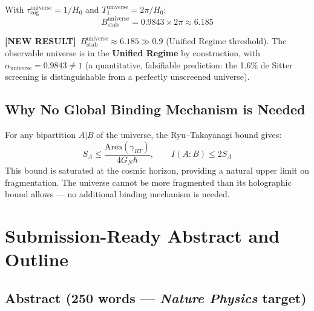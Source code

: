 \documentclass[11pt,letterpaper]{article}
\newcommand{\NEW}{\textcolor{newresult}{\textbf{[NEW RESULT]}}}
\newcommand{\SA}{S_A}
\newcommand{\tcog}{\tau_{\mathrm{cog}}}
\begin{document}
With $\tcog^{\mathrm{universe}} = 1/H_0$ and $T_1^{\mathrm{universe}} = 2\pi/H_0$:
\begin{equation}
  \boxed{B_{\mathrm{stab}}^{\mathrm{universe}} = 0.9843 \times 2\pi \approx 6.185}
  \label{eq:Bstab_universe}
\end{equation}

\NEW\ $B_{\mathrm{stab}}^{\mathrm{universe}} \approx 6.185 \gg 0.9$ (Unified Regime threshold). The observable universe is in the \textbf{Unified Regime} by construction, with $\alpha_{\mathrm{universe}} = 0.9843 \neq 1$ (a quantitative, falsifiable prediction: the 1.6\% de Sitter screening is distinguishable from a perfectly unscreened universe).

\subsection{Why No Global Binding Mechanism is Needed}

For any bipartition $A|B$ of the universe, the Ryu--Takayanagi bound gives:
\begin{equation}
  \SA \leq \frac{\mathrm{Area}(\gamma_{RT})}{4G_N\hbar}, \qquad I(A:B) \leq 2\SA
\end{equation}
This bound is saturated at the cosmic horizon, providing a natural upper limit on fragmentation. The universe cannot be more fragmented than its holographic bound allows --- no additional binding mechanism is needed.

\newpage
\section{Submission-Ready Abstract and Outline}

\subsection*{Abstract (250 words --- \textit{Nature Physics} target)}
\end{document}
